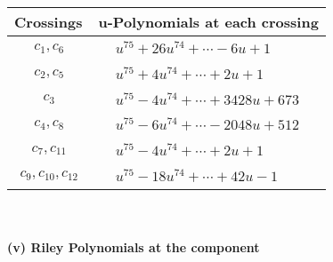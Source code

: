 \documentclass[1p]{elsarticle_modified}
\theoremstyle{definition}
\begin{document}
\begin{tabular}{m{50pt}|m{274pt}}
Crossings & \hspace{64pt}u-Polynomials at each crossing \\
\hline $$\begin{aligned}c_{1},c_{6}\end{aligned}$$&$\begin{aligned}
&u^{75}+26 u^{74}+\cdots-6 u+1
\end{aligned}$\\
\hline $$\begin{aligned}c_{2},c_{5}\end{aligned}$$&$\begin{aligned}
&u^{75}+4 u^{74}+\cdots+2 u+1
\end{aligned}$\\
\hline $$\begin{aligned}c_{3}\end{aligned}$$&$\begin{aligned}
&u^{75}-4 u^{74}+\cdots+3428 u+673
\end{aligned}$\\
\hline $$\begin{aligned}c_{4},c_{8}\end{aligned}$$&$\begin{aligned}
&u^{75}-6 u^{74}+\cdots-2048 u+512
\end{aligned}$\\
\hline $$\begin{aligned}c_{7},c_{11}\end{aligned}$$&$\begin{aligned}
&u^{75}-4 u^{74}+\cdots+2 u+1
\end{aligned}$\\
\hline $$\begin{aligned}c_{9},c_{10},c_{12}\end{aligned}$$&$\begin{aligned}
&u^{75}-18 u^{74}+\cdots+42 u-1
\end{aligned}$\\
\hline
\end{tabular}\\~\\
\newpage\renewcommand{\arraystretch}{1}
\flushleft \textbf{(v) Riley Polynomials at the component}\newline \\
\end{document}
